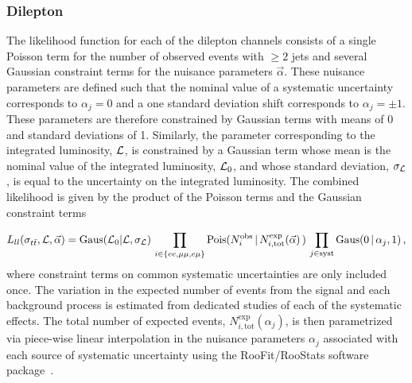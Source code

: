 \subsubsection{Dilepton}
\label{sec:dilep}


The likelihood function for each of the dilepton channels consists of a single Poisson term for the number of observed events with $\ge2$ jets and several Gaussian constraint terms for the nuisance parameters $\vec{\alpha}$.   
These nuisance parameters are defined such that the nominal value of a systematic uncertainty corresponds to $\alpha_j = 0$ and a one standard deviation shift corresponds to $\alpha_j = \pm 1$.
These parameters are therefore constrained by Gaussian terms with means of 0 and standard deviations of 1.
Similarly, the parameter corresponding to the integrated luminosity, ${\cal L}$, is constrained by a Gaussian term whose mean is the nominal value of the integrated luminosity, ${\cal L}_{0}$, and whose standard deviation, $\sigma_{{\cal L}}$, is equal to the uncertainty on the integrated luminosity.
The combined likelihood is given by the product of the Poisson terms and the Gaussian constraint terms

\begin{equation}\label{Eq:dileplikelihood}
  L_{ll}(\sigma_{t\bar{t}}, {\cal L}, \vec{\alpha}) = \text{Gaus}({\cal L}_0 | {\cal L}, \sigma_{\cal L})\, \prod_{i\in \{ ee,\mu\mu,e\mu\} }  \text{Pois}(N^{\text{obs}}_i \,|\, N^{\text{exp}}_{i, \text{tot}}(\vec{\alpha})\,) \,  \prod_{j\in \text{syst}} \text{Gaus}( 0 \,|\, \alpha_{j}, 1) \,,
\end{equation}
where constraint terms on common systematic uncertainties are only included once.  
The variation in the expected number of events from the signal and each background process is estimated from dedicated studies of each of the systematic effects.  
The total number of expected events, $N^{\text{exp}}_{i,\text{tot}}(\alpha_j)$, is then parametrized via piece-wise linear interpolation in the nuisance parameters $\alpha_j$ associated with each source of systematic uncertainty using the RooFit/RooStats software package~\cite{Verkerke:2003ir,Moneta:2010pm}.

